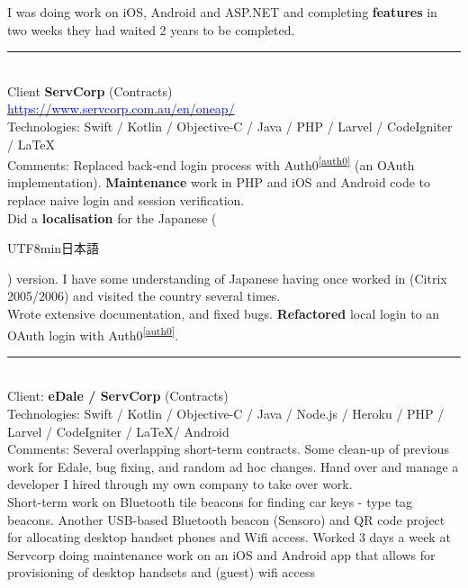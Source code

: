 \documentclass{article}
\begin{document}
I was doing work on iOS, Android and ASP.NET and completing {\bf features} in two weeks they had waited 2 years to be completed.  \\

\noindent\hfil\rule{0.5\textwidth}{.4pt}\hfil
\\

Client    \textbf  { ServCorp} (Contracts) \\ 
\textcolor{blue} { \underline{https://www.servcorp.com.au/en/oneap/ }} \\
Technologies: Swift / Kotlin / Objective-C / Java / PHP / Larvel / CodeIgniter / \LaTeX \\


Comments: 
Replaced back-end login process with Auth0\textsuperscript{\ref{auth0}} (an OAuth implementation). {\bf Maintenance} work in PHP and iOS and Android code to replace naive login and session verification. \\
Did a {\bf localisation} for the Japanese (\begin{CJK}{UTF8}{min}日本語\end{CJK} ) version.  I have some understanding of Japanese having once worked in (Citrix 2005/2006) and visited the country several times. \\
Wrote extensive documentation, and fixed bugs. {\bf Refactored} local login to an OAuth login with Auth0\textsuperscript{\ref{auth0}}.
\\

\noindent\hfil\rule{0.5\textwidth}{.4pt}\hfil
\\

Client:    \textbf  { eDale / ServCorp} (Contracts)   \\
Technologies: Swift / Kotlin / Objective-C / Java / Node.js / Heroku / PHP / Larvel / CodeIgniter / \LaTeX  / Android \\

Comments: Several overlapping short-term contracts. Some clean-up of previous work for Edale, bug fixing, and random ad hoc changes.  Hand over and manage a developer I hired through my own company to take over work. \\
 Short-term work on Bluetooth tile beacons for finding car keys - type tag beacons. Another USB-based Bluetooth beacon (Sensoro) and QR code project for allocating desktop handset phones and Wifi access. Worked 3 days a week at Servcorp doing  maintenance work on an iOS and Android app that allows for provisioning of desktop handsets  and (guest) wifi access \\
\end{document}
